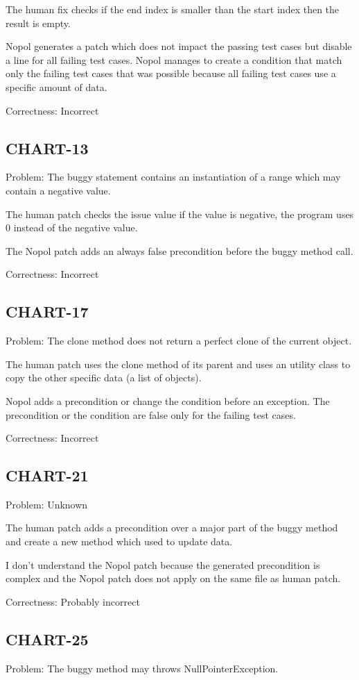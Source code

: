 \documentclass{article}
\begin{document}
The human fix checks if the end index is smaller than the start index then the result is empty.

Nopol generates a patch which does not impact the passing test cases but 
disable a line for all failing test cases. Nopol manages to create a condition that match only the failing test cases that was possible because all failing test cases use a specific amount of data.

Correctness: Incorrect

\subsection{CHART-13}
Problem: The buggy statement contains an instantiation of a range which may contain a negative value.

The human patch checks the issue value if the value is negative, the program uses 0 instead of the negative value. 

The Nopol patch adds an always false precondition before the buggy method call.

Correctness: Incorrect

\subsection{CHART-17} 
Problem: The clone method does not return a perfect clone of the current object.

The human patch uses the clone method of its parent and uses an utility class to copy the other specific data (a list of objects).

Nopol adds a precondition or change the condition before an exception. The precondition or the condition are false only for the failing test cases.

Correctness: Incorrect

\subsection{CHART-21}
Problem: Unknown

The human patch adds a precondition over a major part of the buggy method and create a new method which used to update data.

I don't understand the Nopol patch because the generated precondition is complex and the Nopol patch does not apply on the same file as human patch.

Correctness: Probably incorrect

\subsection{CHART-25}
Problem: The buggy method may throws NullPointerException.
\end{document}
